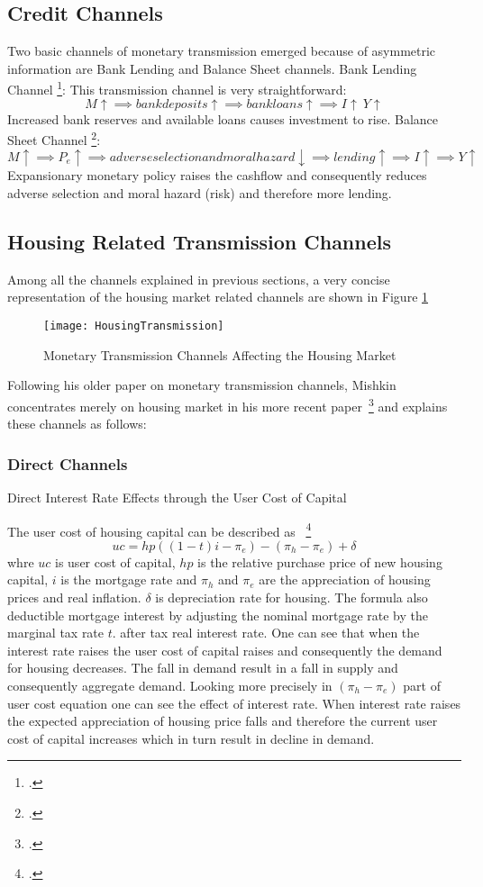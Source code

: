 \subsection{Credit Channels}
Two basic channels of monetary transmission emerged because of asymmetric information are Bank Lending and Balance Sheet channels. 
Bank Lending Channel \footcite[See.][]{Mishkin1996}:
This transmission channel is very straightforward:
 \[M \uparrow \implies bank deposits \uparrow \implies bank loans \uparrow \implies I \uparrow\ Y \uparrow\]
Increased bank reserves and available loans causes investment to rise.
Balance Sheet Channel \footcite[See.][]{Mishkin1996}:
 \[M \uparrow \implies P_e \uparrow \implies adverse selection and moral hazard \downarrow \implies lending \uparrow \implies I \uparrow \implies Y \uparrow\]
Expansionary monetary policy raises the cashflow and consequently reduces adverse selection and moral hazard (risk) and therefore more lending.

\subsection{Housing Related Transmission Channels}

Among all the channels explained in previous sections, a very concise representation of the housing market related channels are shown in Figure \ref{fig:HousingTransmission}
\begin{figure}[H]
\caption{Monetary Transmission Channels Affecting the Housing Market }\label{fig:HousingTransmission}
\texttt{[image: HousingTransmission]}
\\
\cite[Source: See][]{Wadud2009}
\end{figure}

Following his older paper on monetary transmission channels, Mishkin concentrates merely on housing market in his more recent paper~\footcite[See.][]{Mishkin1996} and explains these channels as follows:
\subsubsection{Direct Channels}
Direct Interest Rate Effects through the User Cost of Capital

The user cost of housing capital can be described as ~\footcite[See.][]{Mishkin2007}
 \[ uc = hp((1-t)i - \pi_e) - (\pi_h - \pi_e) + \delta \]
 whre $uc$ is user cost of capital, $hp$ is the relative purchase price of new housing capital, $i$ is the mortgage rate and $\pi_h$ and $\pi_e$ are the appreciation of housing prices and real inflation. $\delta$ is depreciation rate for housing. The formula also deductible mortgage interest by adjusting the nominal mortgage rate by the marginal tax rate $t$. after tax real interest rate. One can see that when the interest rate raises the user cost of capital raises  and consequently the demand for housing decreases. The fall in demand result in a fall in supply and consequently aggregate demand. Looking more precisely in $(\pi_h - \pi_e)$ part of user cost equation one can see the effect of interest rate. When interest rate raises the expected appreciation of housing price falls and therefore the current user cost of capital increases which in turn result in decline in demand. 

